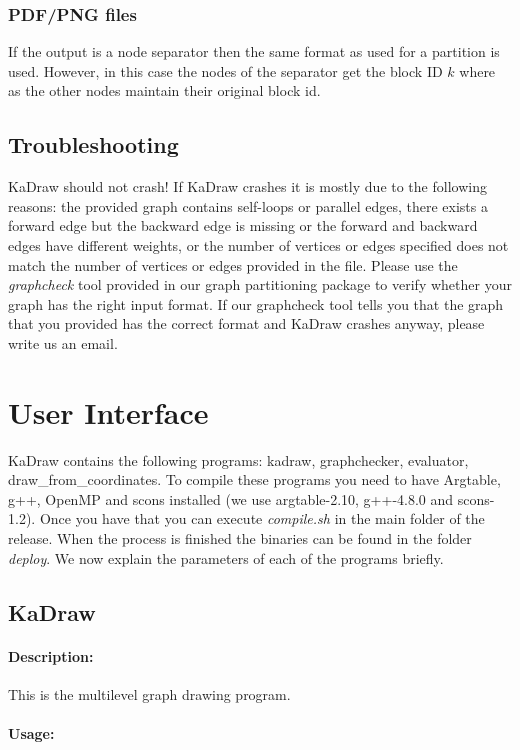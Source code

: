 \documentclass[11pt]{article}
\begin{document}
\subsubsection{PDF/PNG files}
If the output is a node separator then the same format as used for a partition is used. However, in this case the nodes of the separator get the block ID $k$ where as the other nodes maintain their original block id. 
\subsection{Troubleshooting}
KaDraw should not crash! If KaDraw crashes it is mostly due to the following reasons: the provided graph contains self-loops or parallel edges, there exists a forward edge but the backward edge is missing or the forward and backward edges have different weights, or the number of vertices or edges specified does not match the number of vertices or edges provided in the file.
Please use the \emph{graphcheck} tool provided in our graph partitioning package to verify whether your graph has the right input format. If our graphcheck tool tells you that the graph that you provided has the correct format and KaDraw crashes anyway, please write us an email.

\vfill
\pagebreak
\section{User Interface}
KaDraw contains the following programs: kadraw, graphchecker, evaluator, draw\_from\_coordinates. To compile these programs you need to have Argtable, g++, OpenMP and scons installed (we use argtable-2.10, g++-4.8.0 and scons-1.2). Once you have that you can execute \emph{compile.sh} in the main folder of the release. When the process is finished the binaries can be found in the folder \emph{deploy}. We now explain the parameters of each of the programs briefly.
\subsection{KaDraw}
\paragraph*{Description:} This is the multilevel graph drawing program. 
\paragraph*{Usage:\\} 
\end{document}
